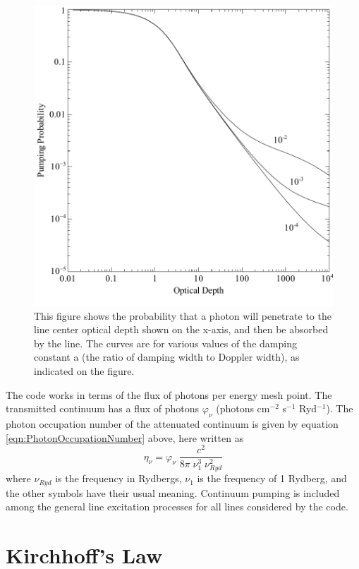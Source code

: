 \begin{figure}
\centering
\includegraphics[scale=0.8]{pump_probability}
\caption[Fluorescent pumping probability]{\label{fig:pump_probability}This figure
shows the probability that a photon will penetrate
to the line center optical depth shown on the x-axis, and then be absorbed
by the line.  The curves are for various values of the damping constant
a (the ratio of damping width to Doppler width), as indicated on the
figure.}
\end{figure}

The code works in terms of the flux of photons per energy mesh point.
The transmitted continuum has a flux of photons $\varphi_\nu$
(photons cm$^{-2}$ s$^{-1}$ Ryd$^{-1}$).
The photon occupation number of the attenuated continuum is given by equation \ref{eqn:PhotonOccupationNumber} above, here written as
\begin{equation}
{\eta _\nu } = {\varphi _\nu }\;\frac{{{c^2}}}{{8\pi \;\nu _1^3\;\nu
_{Ryd}^2}}
\end{equation}
where $\nu_{Ryd}$ is the frequency in Rydbergs,
$\nu_1$ is the frequency of 1 Rydberg,
and the other symbols have their usual meaning.
Continuum pumping is
included among the general line excitation processes for all lines
considered by the code.

\section{Kirchhoff's Law}

